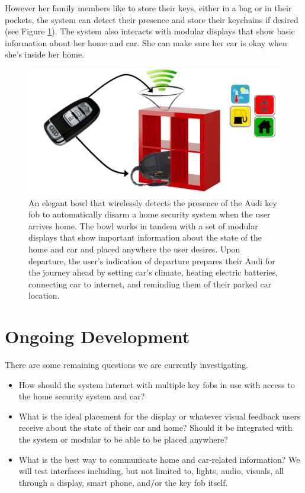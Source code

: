 However her family members like to store their keys, either in a bag or in their pockets, the system can detect their presence and store their keychains if desired (see Figure \ref{fig:Vision}). The system also interacts with modular displays that show basic information about her home and car. She can make sure her car is okay when she's inside her home.

\begin{figure}[ht]
\centering
	\includegraphics[keepaspectratio, width=6in]{Figures/Specifications/vision.jpg}
	\caption[Design vision overview]{An elegant bowl that wirelessly detects the presence of the Audi key fob to automatically disarm a home security system when the user arrives home. The bowl works in tandem with a set of modular displays that show important information about the state of the home and car and placed anywhere the user desires. Upon departure, the user’s indication of departure prepares their Audi for the journey ahead by setting car’s climate, heating electric batteries, connecting car to internet, and reminding them of their parked car location.}
	\label{fig:Vision}
	
\end{figure}

\section{Ongoing Development}

There are some remaining questions we are currently investigating.

\begin{itemize}
    \item How should the system interact with multiple key fobs in use with access to the home security system and car?
    \item What is the ideal placement for the display or whatever visual feedback users receive about the state of their car and home? Should it be integrated with the system or modular to be able to be placed anywhere?
    \item What is the best way to communicate home and car-related information? We will test interfaces including, but not limited to, lights, audio, visuals, all through a display, smart phone, and/or the key fob itself.
\end{itemize}
    
